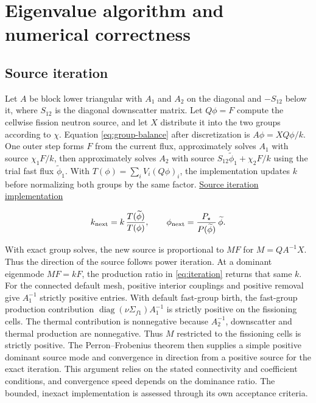 \documentclass[11pt,letterpaper]{article}
\begin{document}
\section{Eigenvalue algorithm and numerical
correctness}\label{eigenvalue-algorithm-and-numerical-correctness}

\subsection{Source iteration}\label{source-iteration}

Let \(A\) be block lower triangular with \(A_1\) and \(A_2\) on the diagonal and
\(-S_{12}\) below it, where \(S_{12}\) is the diagonal downscatter matrix. Let
\(Q\phi=F\) compute the cellwise fission neutron source, and let \(X\) distribute it
into the two groups according to \(\chi\). Equation \eqref{eq:group-balance} after
discretization is \(A\phi=XQ\phi/k\). One outer step forms \(F\) from the current flux,
approximately solves \(A_1\) with source \(\chi_1F/k\), then approximately solves
\(A_2\) with source \(S_{12}\widetilde\phi_1+
\chi_2F/k\) using the trial fast flux \(\widetilde\phi_1\). With
\(T(\phi)=\sum_i V_i(Q\phi)_i\), the implementation updates \(k\) before normalizing
both groups by the same factor.
\href{https://github.com/hkkho/CRS/blob/4341ae8881f5827988c3d8b1859aa9e8f13cd8a6/src/ReactorSim.Core/Domain/SpatialEigenIterationContracts.cs\#L388}{Source
iteration implementation}

\begin{equation}
\label{eq:iteration}
k_{\rm next}=k\,\frac{T(\widetilde\phi)}{T(\phi)},\qquad
\phi_{\rm next}=\frac{P_\star}{P(\widetilde\phi)}\,\widetilde\phi.
\end{equation}

With exact group solves, the new source is proportional to \(M F\) for \(M=QA^{-1}X\).
Thus the direction of the source follows power iteration. At a dominant eigenmode
\(MF=kF\), the production ratio in \eqref{eq:iteration} returns that same \(k\). For the
connected default mesh, positive interior couplings and positive removal give
\(A_1^{-1}\) strictly positive entries. With default fast-group birth, the fast-group
production contribution \(\operatorname{diag}(\nu\Sigma_{f1})A_1^{-1}\) is strictly
positive on the fissioning cells. The thermal contribution is nonnegative because
\(A_2^{-1}\), downscatter and thermal production are nonnegative. Thus \(M\) restricted
to the fissioning cells is strictly positive. The Perron--Frobenius theorem then
supplies a simple positive dominant source mode and convergence in direction from a
positive source for the exact iteration. This argument relies on the stated connectivity
and coefficient conditions, and convergence speed depends on the dominance ratio. The
bounded, inexact implementation is assessed through its own acceptance criteria.
\cite{ref-4}
\end{document}
